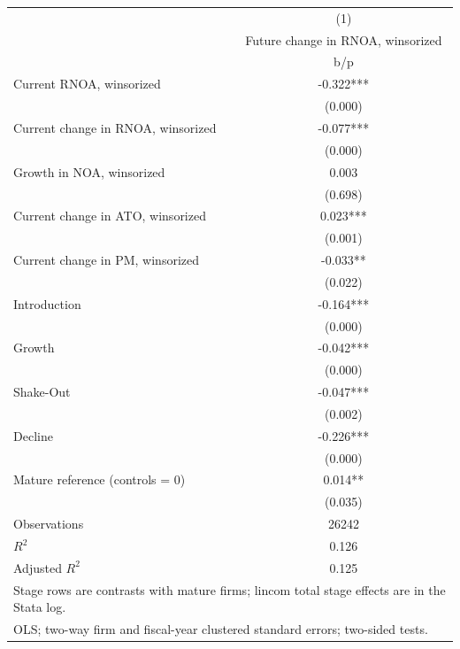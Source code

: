 {
\def\sym#1{\ifmmode^{#1}\else\(^{#1}\)\fi}
\begin{tabular}{l*{1}{c}}
\hline\hline
                    &\multicolumn{1}{c}{(1)}\\
                    &\multicolumn{1}{c}{Future change in RNOA, winsorized}\\
                    &         b/p   \\
\hline
Current RNOA, winsorized&      -0.322***\\
                    &     (0.000)   \\
Current change in RNOA, winsorized&      -0.077***\\
                    &     (0.000)   \\
Growth in NOA, winsorized&       0.003   \\
                    &     (0.698)   \\
Current change in ATO, winsorized&       0.023***\\
                    &     (0.001)   \\
Current change in PM, winsorized&      -0.033** \\
                    &     (0.022)   \\
Introduction        &      -0.164***\\
                    &     (0.000)   \\
Growth              &      -0.042***\\
                    &     (0.000)   \\
Shake-Out           &      -0.047***\\
                    &     (0.002)   \\
Decline             &      -0.226***\\
                    &     (0.000)   \\
Mature reference (controls = 0)&       0.014** \\
                    &     (0.035)   \\
\hline
Observations        &       26242   \\
\(R^{2}\)           &       0.126   \\
Adjusted \(R^{2}\)  &       0.125   \\
\hline\hline
\multicolumn{2}{l}{\footnotesize Stage rows are contrasts with mature firms; lincom total stage effects are in the Stata log.}\\
\multicolumn{2}{l}{\footnotesize OLS; two-way firm and fiscal-year clustered standard errors; two-sided tests.}\\
\end{tabular}
}
